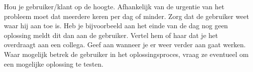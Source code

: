Hou je gebruiker/klant op de hoogte. Afhankelijk van de urgentie van het probleem moet dat meerdere keren per dag of minder. Zorg dat de gebruiker weet waar hij aan toe is. Heb je bijvoorbeeld aan het einde van de dag nog geen oplossing meldt dit dan aan de gebruiker. Vertel hem of haar dat je het overdraagt aan een collega. Geef aan wanneer je er weer verder aan gaat werken. Waar mogelijk betrek de gebruiker in het oplossingsproces, vraag ze eventueel om een mogelijke oplossing te testen.
